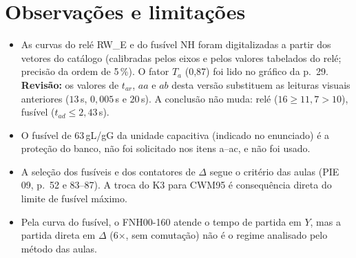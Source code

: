 \documentclass[11pt,a4paper]{article}
\begin{document}
\section{Observa\c{c}\~oes e limita\c{c}\~oes}
\begin{itemize}[leftmargin=1.2em]
\item As curvas do rel\'e RW\_E e do fus\'ivel NH foram digitalizadas a partir dos vetores do cat\'alogo (calibradas pelos eixos e pelos valores tabelados do rel\'e; precis\~ao da ordem de 5\,\%). O fator $T_a$ (0,87) foi lido no gr\'afico da p.~29. \textbf{Revis\~ao:} os valores de $t_{ar}$, $aa$ e $ab$ desta vers\~ao substituem as leituras visuais anteriores ($13$\,s, $0{,}005$\,s e $20$\,s). A conclus\~ao n\~ao muda: rel\'e ($16\ge 11{,}7>10$), fus\'ivel ($t_{ad}\le 2{,}43$\,s).
\item O fus\'ivel de $63$\,gL/gG da unidade capacitiva (indicado no enunciado) \'e a prote\c{c}\~ao do banco, n\~ao foi solicitado nos itens a--ac, e n\~ao foi usado.
\item A sele\c{c}\~ao dos fus\'iveis e dos contatores de $\Delta$ segue o crit\'erio das aulas (PIE 09, p.~52 e 83--87). A troca do K3 para CWM95 \'e consequ\^encia direta do limite de fus\'ivel m\'aximo.
\item Pela curva do fus\'ivel, o FNH00-160 atende o tempo de partida em $Y$, mas a partida direta em $\Delta$ (6$\times$, sem comuta\c{c}\~ao) n\~ao \'e o regime analisado pelo m\'etodo das aulas.
\end{itemize}
\end{document}
